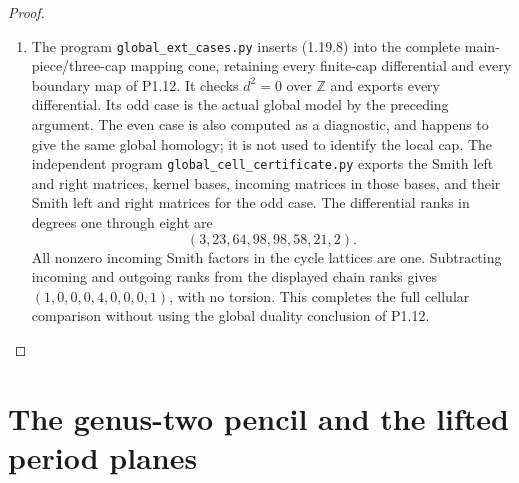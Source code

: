 \begin{proof}
\begin{enumerate}[label=\arabic*.]
\item The program \texttt{global\_ext\_cases.py} inserts (1.19.8) into
the complete main-piece/three-cap mapping cone, retaining every
finite-cap differential and every boundary map of P1.12.
It checks $d^2=0$ over $\mathbb Z$ and exports every differential.
Its odd case is the actual global model by the preceding argument.
The even case is also computed as a diagnostic, and happens to give
the same global homology; it is not used to identify the local cap.
The independent program \texttt{global\_cell\_certificate.py}
exports the Smith left and right matrices, kernel bases, incoming
matrices in those bases, and their Smith left and right matrices
for the odd case.  The differential ranks in degrees one through
eight are
\[
                 (3,23,64,98,98,58,21,2).
\]
All nonzero incoming Smith factors in the cycle lattices are one.
Subtracting incoming and outgoing ranks from the displayed chain
ranks gives $(1,0,0,0,4,0,0,0,1)$, with no torsion.
This completes the full cellular comparison without using the
global duality conclusion of P1.12.

\end{enumerate}
\end{proof}


\section{The genus-two pencil and the lifted period planes}



